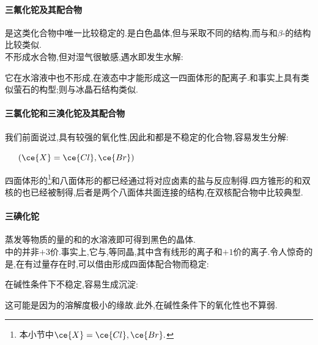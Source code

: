 \documentclass{ctexart}
\begin{document}
\paragraph{三氟化铊及其配合物}
是这类化合物中唯一比较稳定的.是白色晶体,但与采取不同的结构,而与和$\beta$-的结构比较类似.\\
\indent {}不形成水合物,但对湿气很敏感,遇水即发生水解:
\begin{center}
\end{center}

\indent 它在水溶液中也不形成\ce{[TlF4]-},在液态中才能形成这一四面体形的配离子.和事实上具有类似萤石的构型;则与冰晶石结构类似.
\paragraph{三氯化铊和三溴化铊及其配合物}
我们前面说过,具有较强的氧化性,因此和都是不稳定的化合物,容易发生分解:
\begin{center}
    \ \ \ $(\ce{X}=\ce{Cl},\ce{Br})$
\end{center}

\indent 四面体形的\ce{[TlX4]-}\footnote{本小节中$\ce{X}=\ce{Cl},\ce{Br}.$}和八面体形的都已经通过将对应卤素的盐与反应制得.四方锥形的和双核的也已经被制得,后者是两个八面体共面连接的结构,在双核配合物中比较典型.
\paragraph{三碘化铊}
蒸发等物质的量的和的水溶液即可得到黑色的晶体.\\
\indent {}中的并非$+3$价.事实上,它与,等同晶,其中含有线形的\ce{[I3]-}离子和$+1$价的离子.令人惊奇的是,在有过量存在时,可以借由形成四面体配合物而稳定:
\begin{center}
\end{center}

\indent {}在碱性条件下不稳定,容易生成沉淀:
\begin{center}
\end{center}
这可能是因为的溶解度极小的缘故.此外,在碱性条件下的氧化性也不算弱.
\end{document}
